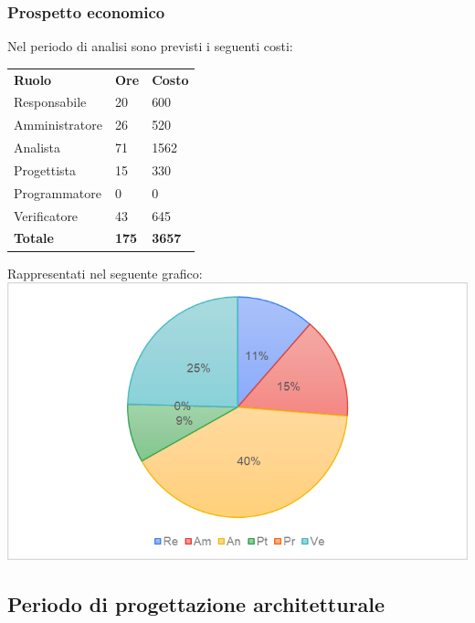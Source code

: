		\subsubsection{Prospetto economico}
		Nel periodo di analisi sono previsti i seguenti costi:
		\begin{longtable} {
			>{}p{32mm}
			>{}p{20mm}
			>{}p{20mm}
		}
		\rowcolor{gray!50}
		
		\textbf{Ruolo} & \textbf{Ore} & \textbf{Costo} \TBstrut \\
		Responsabile & 20 & 600 \TBstrut \\
		Amministratore & 26 & 520 \TBstrut \\
		Analista & 71 & 1562 \TBstrut \\
		Progettista & 15 & 330 \TBstrut \\
		Programmatore & 0 & 0 \TBstrut \\
		Verificatore & 43 & 645 \TBstrut \\
		\textbf{Totale} & \textbf{175}& \textbf{3657} \TBstrut \\		
		\end{longtable}
		Rappresentati nel seguente grafico: \\
		\includegraphics[width=\linewidth]{./img/Grafici/2.png}
\subsection{Periodo di progettazione architetturale}
